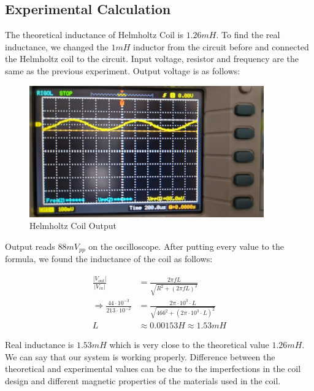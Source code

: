\newpage{}
\thispagestyle{plain}

\subsection{Experimental Calculation}

The theoretical inductance of Helmholtz Coil is \( 1.26mH \). To find the real inductance, we changed the $1mH$ inductor from the circuit before and connected the Helmholtz coil to the circuit. Input voltage, resistor and frequency are the same as the previous experiment. Output voltage is as follows:

\begin{figure}[h]
    \centering
    \includegraphics[width=0.9\textwidth]{assets/1k-helmholtz-output.jpg}
    \caption{Helmholtz Coil Output}
    \label{fig:1k-helmholtz-output}
\end{figure}

Output reads $88mV_{pp}$ on the oscilloscope. After putting every value to the formula, we found the inductance of the coil as follows:

\begin{align*}
    \frac{|V_{out}|}{|V_{in}|} &= \frac{2\pi f L}{\sqrt{R^2 + (2\pi f L)^2}} \\
    \Rightarrow \frac{44 \cdot 10^{-3}}{213 \cdot 10^{-2}} &= \frac{2\pi \cdot 10^3 \cdot L}{\sqrt{466^2 + (2\pi \cdot 10^3 \cdot L)^2}} \\
    L &\approx 0.00153H \approx 1.53mH
\end{align*}

Real inductance is \( 1.53mH \) which is very close to the theoretical value $1.26mH$. We can say that our system is working properly. Difference between the theoretical and experimental values can be due to the imperfections in the coil design and different magnetic properties of the materials used in the coil.

